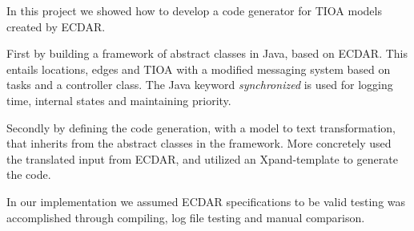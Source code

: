 In this project we showed how to develop a code generator for TIOA 
models created by ECDAR. 

First by building a framework of abstract classes in Java, based on 
ECDAR. This entails locations, edges and TIOA with a modified messaging 
system based on tasks and a controller class. The Java keyword 
\textit{synchronized} is used for logging time, internal states and 
maintaining priority. 

Secondly by defining the code generation, with a model to text 
transformation, that inherits from the abstract classes in the 
framework. More concretely used the translated input from ECDAR, and 
utilized an Xpand-template to generate the code. 

In our implementation we assumed ECDAR specifications to be valid 
testing was accomplished through compiling, log file testing and manual 
comparison. 
